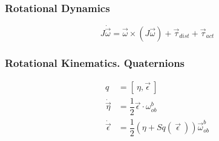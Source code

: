 \documentclass{beamer}
\begin{document}
\begin{frame}
\frametitle{Rotational Dynamics}
\begin{equation*}
J\dot{\vec{\omega}} =
 \vec{\omega}\times\left(J\vec{\omega}\right) + 
 \vec{\tau}_{dist} + \vec{\tau}_{act}
\end{equation*}
\end{frame}

\begin{frame}
\frametitle{Rotational Kinematics. Quaternions}
\begin{align*}
q &= \left[\
\eta, \vec{\epsilon}\ \right]\\
\dot{\vec{\eta}} &= \dfrac{1}{2} \vec{\epsilon} \cdot \omega^b_{ob}\\
\dot{\vec{\epsilon}} &= \dfrac{1}{2}\left(\eta +Sq(\ \vec{\epsilon}\ ) \right)\vec{\omega}^b_{ob}
\end{align*}

\begin{equation*}

\end{equation*}
\end{frame}
\end{document}
